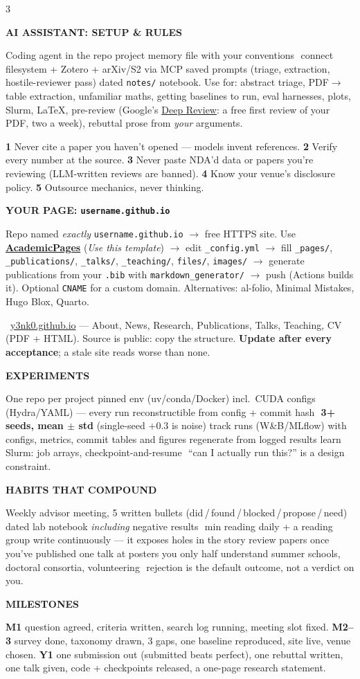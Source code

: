 \documentclass[10pt,a4paper]{article}
\newcommand{\head}[1]{%
  \vspace{4.5pt}{\color{brand}\rule{\linewidth}{0.9pt}}\par\vspace{1.5pt}%
  {\bfseries\color{brand}\MakeUppercase{#1}}\par\vspace{2pt}}
\newcommand{\sub}[1]{\par\addvspace{2.6pt}\noindent{\bfseries\color{ink}#1}\ \ignorespaces}
\newcommand{\code}[1]{\texttt{#1}}
\newcommand{\lnk}[2]{\href{#1}{\color{brandlight}#2}}
\newcommand{\dt}{\,\textperiodcentered\,\allowbreak}
\newenvironment{flag}
 {\par\addvspace{2pt}\setlength{\FrameSep}{3pt}%
  \def\FrameCommand{{\color{accent}\vrule width 1.4pt}\hspace{4pt}}%
  \MakeFramed{\advance\hsize-\width \FrameRestore}\parindent=0pt\ignorespaces}
 {\par\endMakeFramed\addvspace{2pt}}
\begin{document}
\begin{multicols}{3}
\head{AI assistant: setup \& rules}
Coding agent in the repo\dt project memory file with your conventions\dt
connect filesystem + Zotero + arXiv/S2 via MCP\dt saved prompts (triage,
extraction, hostile-reviewer pass)\dt dated \code{notes/} notebook.
Use for: abstract triage, PDF$\to$table extraction, unfamiliar maths, getting
baselines to run, eval harnesses, plots, Slurm, LaTeX, pre-review (Google's
\lnk{https://research.google/deepreview/}{Deep Review}: a free first review of your
PDF, two a week), rebuttal prose from \emph{your} arguments.
\begin{flag}
\textbf{1} Never cite a paper you haven't opened --- models invent references.
\textbf{2} Verify every number at the source. \textbf{3} Never paste NDA'd data
or papers you're reviewing (LLM-written reviews are banned). \textbf{4} Know
your venue's disclosure policy. \textbf{5} Outsource mechanics, never thinking.
\end{flag}

\head{Your page: \code{username.github.io}}
Repo named \emph{exactly} \code{username.github.io} $\to$ free HTTPS site. Use
\lnk{https://github.com/academicpages/academicpages.github.io}{\textbf{AcademicPages}}
(\emph{Use this template}) $\to$ edit \code{\_config.yml} $\to$ fill
\code{\_pages/}, \code{\_publications/}, \code{\_talks/}, \code{\_teaching/},
\code{files/}, \code{images/} $\to$ generate publications from your \code{.bib}
with \code{markdown\_generator/} $\to$ push (Actions builds it). Optional
\code{CNAME} for a custom domain. Alternatives: al-folio, Minimal Mistakes,
Hugo Blox, Quarto.
\sub{Example}\lnk{https://y3nk0.github.io}{y3nk0.github.io} --- About, News,
Research, Publications, Talks, Teaching, CV (PDF + HTML). Source is public:
copy the structure. \textbf{Update after every acceptance}; a stale site reads
worse than none.

\head{Experiments}
One repo per project\dt pinned env (uv/conda/Docker) incl.\ CUDA\dt configs
(Hydra/YAML) --- every run reconstructible from config + commit hash\dt
\textbf{3+ seeds, mean $\pm$ std} (single-seed $+0.3$ is noise)\dt track runs
(W\&B/MLflow) with configs, metrics, commit\dt tables and figures regenerate
from logged results\dt learn Slurm: job arrays, checkpoint-and-resume\dt
``can I actually run this?'' is a design constraint.

\head{Habits that compound}
Weekly advisor meeting, 5 written bullets (did\,/\,found\,/\,blocked\,/\,propose\,/\,need)\dt
dated lab notebook \emph{including} negative results\dt 20 min reading
daily + a reading group\dt write continuously --- it exposes holes in the
story\dt review papers once you've published one\dt talk at posters you only
half understand\dt summer schools, doctoral consortia, volunteering\dt
rejection is the default outcome, not a verdict on you.

\head{Milestones}
\textbf{M1} question agreed, criteria written, search log running, meeting slot
fixed. \textbf{M2--3} survey done, taxonomy drawn, 3 gaps, one baseline
reproduced, site live, venue chosen. \textbf{Y1} one submission out
(submitted beats perfect), one rebuttal written, one talk given, code +
checkpoints released, a one-page research statement.

\end{multicols}
\end{document}
